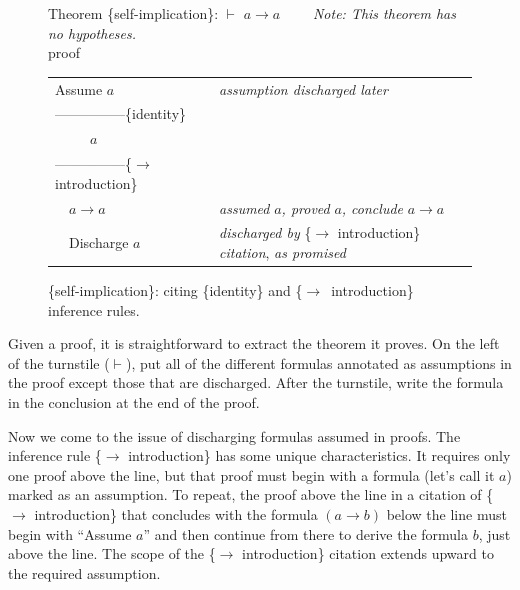 {\begin{figure}
Theorem \{self-implication\}: $\vdash$ $a \rightarrow a$ ~~~~\emph{Note: This theorem has no hypotheses.}\\
proof
\begin{center}
\begin{spacing}{0.9}
\begin{tabular}{ll}
Assume $a$                  &\emph{assumption discharged later}\\
---------------\{identity\} &\\
~~~~~$a$                    &\\
---------------\{$\rightarrow$ introduction\} &\\
~~$a \rightarrow a$         &\emph{assumed} $a$\emph{, proved} $a$\emph{, conclude} $a \rightarrow a$\\
~~Discharge $a$             &\emph{discharged by} \{$\rightarrow$ introduction\} \emph{citation}, \emph{as promised}\\
\end{tabular}
\end{spacing}
\end{center}
\caption{\{self-implication\}: citing  \{identity\} and \{$\rightarrow$\ introduction\} inference rules.}
\label{fig:or-self-imp-proof}
\end{figure}

Given a proof, it is straightforward to extract
the theorem it proves.
On the left of the turnstile ($\vdash$), put all of the different
formulas annotated as assumptions in the proof
except those that are discharged.
After the turnstile, write the formula in the
conclusion at the end of the proof.

Now we come to the issue of
discharging
formulas assumed in proofs.
The inference rule \{$\rightarrow$ introduction\}
has some unique characteristics.
It requires only one proof above the line,
but that proof must begin with a formula
(let's call it $a$)
marked as an assumption.
To repeat, the proof above the line in a citation of
\{$\rightarrow$ introduction\} that
concludes with the formula $(a \rightarrow b)$
below the line
must begin with ``Assume $a$'' and
then continue from there to derive the formula $b$, just above the line.
The scope of the \{$\rightarrow$ introduction\} citation
extends upward to the required assumption.

}
